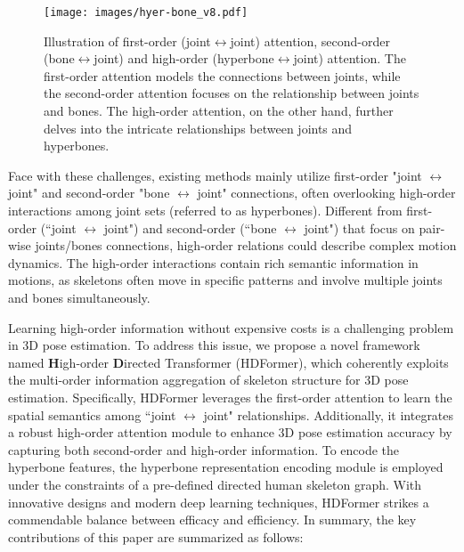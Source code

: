 \documentclass{article}
\begin{document}
\begin{figure}[!t]
    \centering
    \centerline{\texttt{[image: images/hyer-bone\_v8.pdf]}}
    \vspace{-2mm}
    \caption{\small Illustration of first-order (joint$\leftrightarrow{}$joint) attention, second-order (bone$\leftrightarrow{}$joint) and high-order (hyperbone$\leftrightarrow{}$joint) attention. The first-order attention models the connections between joints, while the second-order attention focuses on the relationship between joints and bones. The high-order attention, on the other hand, further delves into the intricate relationships between joints and hyperbones.}
    \vspace{-4mm}
    \label{fig:fron_image}
\end{figure}

Face with these challenges, existing methods mainly utilize first-order "joint $\leftrightarrow$ joint" and second-order "bone $\leftrightarrow$ joint" connections, often overlooking high-order interactions among joint sets (referred to as hyperbones).
Different from first-order (``joint $\leftrightarrow$ joint") and second-order (``bone $\leftrightarrow$ joint") that focus on pair-wise joints/bones connections, high-order relations could describe complex motion dynamics. The high-order interactions contain rich semantic information in motions, as skeletons often move in specific patterns and involve multiple joints and bones simultaneously. 

Learning high-order information without expensive costs is a challenging problem in 3D pose estimation. To address this issue, we propose a novel framework named \textbf{H}igh-order \textbf{D}irected Transformer (HDFormer), which coherently exploits the multi-order information aggregation of skeleton structure for 3D pose estimation.
Specifically, HDFormer leverages the first-order attention to learn the spatial semantics among ``joint $\leftrightarrow$ joint" relationships.
Additionally, it integrates a robust high-order attention module to enhance 3D pose estimation accuracy by capturing both second-order and high-order information.
To encode the hyperbone features, the hyperbone representation encoding module is employed under the constraints of a pre-defined directed human skeleton graph. 
With innovative designs and modern deep learning techniques, HDFormer strikes a commendable balance between efficacy and efficiency. 
In summary, the key contributions of this paper are summarized as follows:
\end{document}
